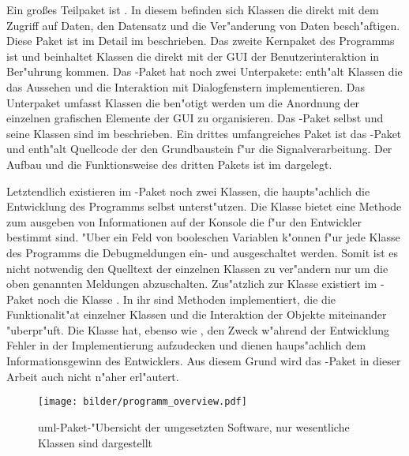 Ein gro{\ss}es Teilpaket ist .
In diesem befinden sich Klassen die direkt mit dem Zugriff auf Daten, den Datensatz und die Ver"anderung von Daten besch"aftigen.
Diese Paket ist im Detail im  beschrieben.
Das zweite Kernpaket des Programms ist  und beinhaltet Klassen die direkt mit der \ac{GUI} der Benutzerinteraktion in Ber"uhrung kommen.
Das -Paket hat noch zwei Unterpakete:
 enth"alt Klassen die das Aussehen und die Interaktion mit Dialogfenstern implementieren.
Das Unterpaket  umfasst Klassen die ben"otigt werden um die Anordnung der einzelnen grafischen Elemente der \ac{GUI} zu organisieren.
Das -Paket selbst und seine Klassen sind im  beschrieben.
Ein drittes umfangreiches Paket ist das -Paket und enth"alt Quellcode der den Grundbaustein f"ur die Signalverarbeitung.
Der Aufbau und die Funktionsweise des dritten Pakets ist im  dargelegt.

Letztendlich existieren im -Paket noch zwei Klassen, die haupts"achlich die Entwicklung des Programms selbst unterst"utzen.
Die Klasse  bietet eine Methode zum ausgeben von Informationen auf der Konsole die f"ur den Entwickler bestimmt sind.
"Uber ein Feld von booleschen Variablen k"onnen f"ur jede Klasse des Programms die Debugmeldungen ein- und ausgeschaltet werden.
Somit ist es nicht notwendig den Quelltext der einzelnen Klassen zu ver"andern nur um die oben genannten Meldungen abzuschalten.
Zus"atzlich zur Klasse  existiert im -Paket noch die Klasse .
In ihr sind Methoden implementiert, die die Funktionalit"at einzelner Klassen und die Interaktion der Objekte miteinander "uberpr"uft.
Die  Klasse hat, ebenso wie , den Zweck w"ahrend der Entwicklung Fehler in der Implementierung aufzudecken und dienen haups"achlich dem Informationsgewinn des Entwicklers.
Aus diesem Grund wird das -Paket in dieser Arbeit auch nicht n"aher erl"autert.

\begin{figure}[htb]
\centering
\texttt{[image: bilder/programm\_overview.pdf]}
\caption[\acs{uml}-Paket-"Ubersicht der umgesetzten Software]{\ac{uml}-Paket-"Ubersicht der umgesetzten Software, nur wesentliche Klassen sind dargestellt}
\label{pic:paket_ubersicht}
\end{figure}

